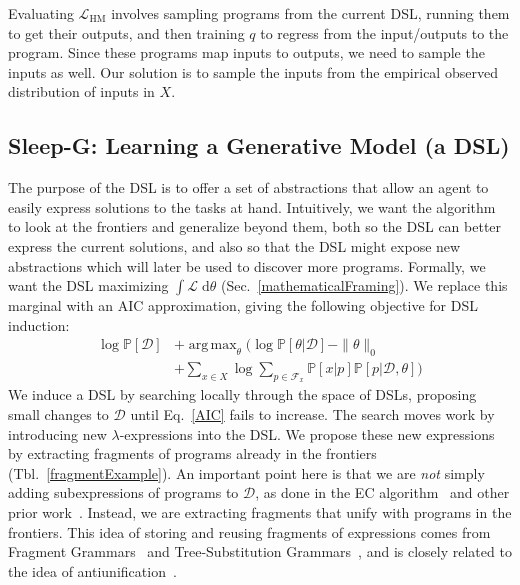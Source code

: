 \documentclass{article}
\newcommand{\system}{\textsc{DreamCoder}~}
\newcommand{\lowerBound}{\mathscr{L}}
\DeclareMathOperator*{\argmax}{arg\,max} %
\newcommand{\probability}{\mathds{P}} %
\begin{document}
Evaluating $\mathcal{L}_{\text{HM}}$ involves sampling programs from
the current DSL, running them to get their outputs,
and then training $q$ to regress from the input/outputs to the program.
Since these programs map inputs to outputs,
we need to sample the inputs as well.
Our solution is to sample the inputs
from the empirical observed distribution of inputs in $X$.

\subsection{Sleep-G: Learning a Generative Model (a DSL)}\label{grammarInductionSection}

The purpose of the DSL is to
offer a set of abstractions
that allow an agent to easily express solutions to the tasks at hand.
Intuitively, we want the algorithm to
look at  the frontiers and
generalize beyond them, 
both so the DSL can better express the current solutions,
and  also so that the DSL might expose new abstractions
which will later be used to
discover more programs.
 Formally, we want the DSL maximizing $\int \lowerBound\;\mathrm{d}\theta$ (Sec.~\ref{mathematicalFraming}).
We replace this marginal with an AIC approximation, giving the following objective for DSL induction:
\begin{align}
\nonumber      \log \probability[\mathcal{D}]& + 
\argmax_{\theta}\Bigg(\log \probability[\theta|\mathcal{D}] - \|\theta\|_0 \\&+\sum_{x\in X}\log \sum_{p\in \mathcal{F}_x}\probability[x|p]\probability[p|\mathcal{D},\theta]\Bigg)
\label{AIC}
  \end{align}
We induce a DSL by searching locally through the space of DSLs,
proposing small changes to $\mathcal{D}$ until Eq.~\ref{AIC} fails to increase.
The search moves work by introducing new
$\lambda$-expressions into the DSL.
We propose these new expressions by extracting fragments of
programs already in the frontiers (Tbl.~\ref{fragmentExample}).
An important point here is that we are \emph{not} simply adding
subexpressions of programs to $\mathcal{D}$, as done in the EC algorithm~\cite{Dechter:2013:BLV:2540128.2540316} and other prior work~\cite{DBLP:conf/ecai/LinDETM14}.  Instead, we are
extracting fragments that unify with programs in the frontiers.  This
idea of storing and reusing fragments of expressions comes from
Fragment Grammars~\cite{tim} and Tree-Substitution
Grammars~\cite{cohn2010inducing}, and is closely related to the idea
of antiunification~\cite{henderson2013cumulative}.
\end{document}
